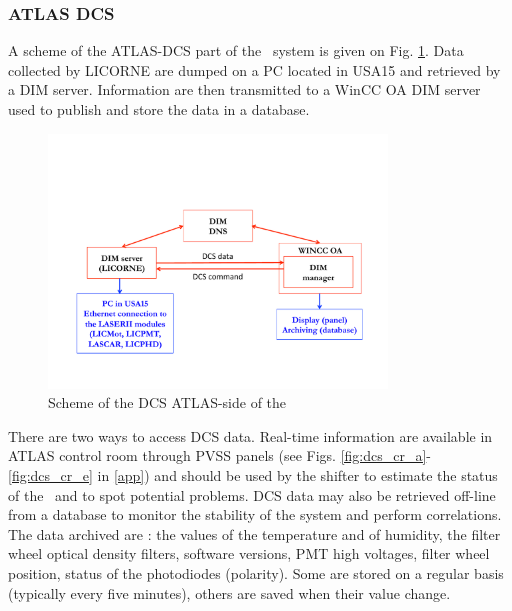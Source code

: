 \subsubsection{ATLAS DCS}

A scheme of the ATLAS-DCS part of the \las~system is given on Fig. \ref{fig:lasdcs}. Data collected by LICORNE are dumped on a PC located in USA15 and retrieved by a DIM server. Information are then transmitted to a WinCC OA \cite{ref:winccoa} DIM server used to publish and store the data in a database.

\begin{figure}[htbp]
\centering
\includegraphics[width=9cm]{figures/LaserII_DCS.pdf}
\caption{Scheme of the DCS ATLAS-side of the \las}\label{fig:lasdcs}
\end{figure}

There are two ways to access DCS data. Real-time information are available in ATLAS control room through PVSS panels (see Figs. \ref{fig:dcs_cr_a}-\ref{fig:dcs_cr_e} in \ref{app}) and should be used by the shifter to estimate the status of the \laser~and to spot potential problems. DCS data may also be retrieved off-line from a database to monitor the stability of the system and perform correlations. The data archived are : the values of the temperature and of humidity, the filter wheel optical density filters, software versions, PMT high voltages, filter wheel position, status of the photodiodes (polarity). Some are stored on a regular basis (typically every five minutes), others are saved when their value change. 